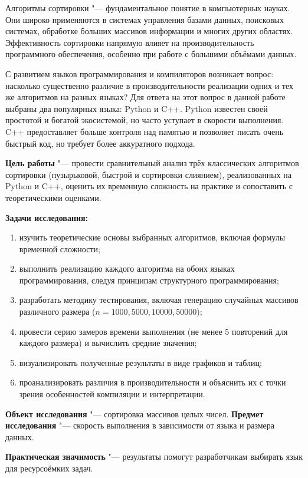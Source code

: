 Алгоритмы сортировки "--- фундаментальное понятие в компьютерных науках. Они широко применяются в системах управления базами данных, поисковых системах, обработке больших массивов информации и многих других областях. Эффективность сортировки напрямую влияет на производительность программного обеспечения, особенно при работе с большими объёмами данных.

С развитием языков программирования и компиляторов возникает вопрос: насколько существенно различие в производительности реализации одних и тех же алгоритмов на разных языках? Для ответа на этот вопрос в данной работе выбраны два популярных языка:  Python и C++. Python известен своей простотой и богатой экосистемой, но часто уступает в скорости выполнения. C++ предоставляет больше контроля над памятью и позволяет писать очень быстрый код, но требует более аккуратного подхода.

\textbf{Цель работы} "--- провести сравнительный анализ трёх классических алгоритмов сортировки (пузырьковой, быстрой и сортировки слиянием), реализованных на Python и C++, оценить их временную сложность на практике и сопоставить с теоретическими оценками.

\textbf{Задачи исследования:}
\begin{enumerate}
    \item изучить теоретические основы выбранных алгоритмов, включая формулы временной сложности;
    \item выполнить реализацию каждого алгоритма на обоих языках программирования, следуя принципам структурного программирования;
    \item разработать методику тестирования, включая генерацию случайных массивов различного размера ($n = 1000, 5000, 10000, 50000$);
    \item провести серию замеров времени выполнения (не менее 5 повторений для каждого размера) и вычислить средние значения;
    \item визуализировать полученные результаты в виде графиков и таблиц;
    \item проанализировать различия в производительности и объяснить их с точки зрения особенностей компиляции и интерпретации.
\end{enumerate}

\textbf{Объект исследования} "--- сортировка массивов целых чисел. 
\textbf{Предмет исследования} "--- скорость выполнения в зависимости от языка и размера данных.

\textbf{Практическая значимость} "--- результаты помогут разработчикам выбирать язык для ресурсоёмких задач. \cite{knuth1998, cormen2009, python_sort}
